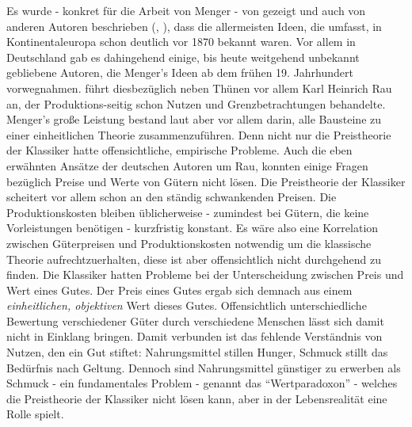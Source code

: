 Es wurde - konkret für die Arbeit von Menger - von \textcite{Streissler1990} gezeigt und auch von anderen Autoren beschrieben (\textcite{Blaug1973}, \textcite{Ekelund2002}), dass die allermeisten Ideen, die \textcite{Menger1871} umfasst, in Kontinentaleuropa schon deutlich vor 1870 bekannt waren. Vor allem in Deutschland gab es dahingehend einige, bis heute weitgehend unbekannt gebliebene Autoren, die Menger's Ideen ab dem frühen 19. Jahrhundert vorwegnahmen. \textcite[S. 159]{Blaug2001} führt diesbezüglich neben Thünen vor allem Karl Heinrich Rau an, der  Produktions-seitig schon Nutzen und Grenzbetrachtungen behandelte. Menger's große Leistung bestand laut \textcite[S. 295]{Rosner2012} aber vor allem darin, alle Bausteine zu einer einheitlichen Theorie zusammenzuführen. Denn nicht nur die Preistheorie der Klassiker hatte offensichtliche, empirische Probleme. Auch die eben erwähnten Ansätze der deutschen Autoren um Rau, konnten einige Fragen bezüglich Preise und Werte von Gütern nicht lösen. Die Preistheorie der Klassiker scheitert vor allem schon an den ständig schwankenden Preisen. Die Produktionskosten bleiben üblicherweise - zumindest bei Gütern, die keine Vorleistungen benötigen - kurzfristig konstant. Es wäre also eine Korrelation zwischen Güterpreisen und Produktionskosten notwendig um die klassische Theorie aufrechtzuerhalten, diese ist aber offensichtlich nicht durchgehend zu finden. Die Klassiker hatten Probleme bei der Unterscheidung zwischen Preis und Wert eines Gutes. Der Preis eines Gutes ergab sich demnach aus einem \textit{einheitlichen, objektiven} Wert dieses Gutes. Offensichtlich unterschiedliche Bewertung verschiedener Güter durch verschiedene Menschen lässt sich damit nicht in Einklang bringen. Damit verbunden ist das fehlende Verständnis von Nutzen, den ein Gut stiftet: Nahrungsmittel stillen Hunger, Schmuck stillt das Bedürfnis nach Geltung. Dennoch sind Nahrungsmittel günstiger zu erwerben als Schmuck - ein fundamentales Problem - genannt das "`Wertparadoxon"' - welches die Preistheorie der Klassiker nicht lösen kann, aber in der Lebensrealität eine Rolle spielt.

